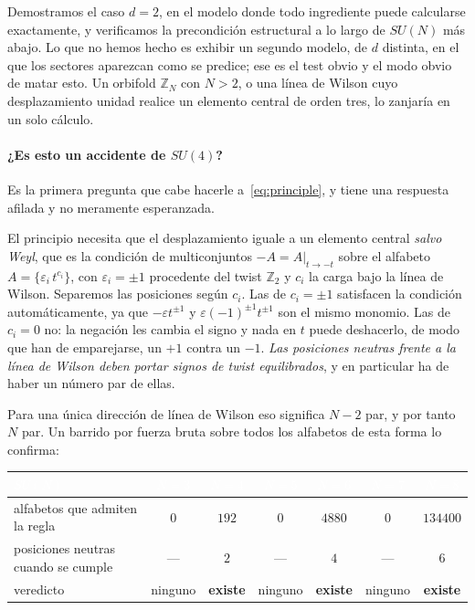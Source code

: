 \documentclass[11pt,a4paper]{article}
\newcommand{\ZZ}{\mathbb{Z}}
\begin{document}
Demostramos el caso $d=2$, en el modelo donde todo ingrediente puede calcularse exactamente, y
verificamos la precondición estructural a lo largo de $SU(N)$ más abajo. Lo que no hemos hecho
es exhibir un segundo modelo, de $d$ distinta, en el que los sectores aparezcan como se
predice; ese es el test obvio y el modo obvio de matar esto. Un orbifold $\ZZ_N$ con $N>2$, o
una línea de Wilson cuyo desplazamiento unidad realice un elemento central de orden tres, lo
zanjaría en un solo cálculo.

\paragraph{¿Es esto un accidente de $SU(4)$?} Es la primera pregunta que cabe hacerle
a~\eqref{eq:principle}, y tiene una respuesta afilada y no meramente esperanzada.

El principio necesita que el desplazamiento iguale a un elemento central \emph{salvo Weyl}, que
es la condición de multiconjuntos $-A=A|_{t\to-t}$ sobre el alfabeto
$A=\{\varepsilon_i\,t^{c_i}\}$, con $\varepsilon_i=\pm1$ procedente del twist $\ZZ_2$ y $c_i$
la carga bajo la línea de Wilson. Separemos las posiciones según $c_i$. Las de $c_i=\pm1$
satisfacen la condición automáticamente, ya que $-\varepsilon t^{\pm1}$ y
$\varepsilon(-1)^{\pm1}t^{\pm1}$ son el mismo monomio. Las de $c_i=0$ no: la negación les
cambia el signo y nada en $t$ puede deshacerlo, de modo que han de emparejarse, un $+1$ contra
un $-1$. \emph{Las posiciones neutras frente a la línea de Wilson deben portar signos de twist
equilibrados}, y en particular ha de haber un número par de ellas.

Para una única dirección de línea de Wilson eso significa $N-2$ par, y por tanto $N$ par. Un
barrido por fuerza bruta sobre todos los alfabetos de esta forma lo confirma:

\begin{center}\small
\begin{tabular}{lcccccc}
\toprule
\rowcolor{hdrblue}
\textcolor{white}{$SU(N)$} & \textcolor{white}{$N{=}3$} & \textcolor{white}{$N{=}4$} &
\textcolor{white}{$N{=}5$} & \textcolor{white}{$N{=}6$} & \textcolor{white}{$N{=}7$} &
\textcolor{white}{$N{=}8$}\\
\midrule
alfabetos que admiten la regla & $0$ & $192$ & $0$ & $4880$ & $0$ & $134400$\\
\rowcolor{softgrey}
posiciones neutras cuando se cumple & --- & $2$ & --- & $4$ & --- & $6$\\
veredicto & ninguno & \textbf{existe} & ninguno & \textbf{existe} & ninguno & \textbf{existe}\\
\bottomrule
\end{tabular}
\end{center}
\end{document}
